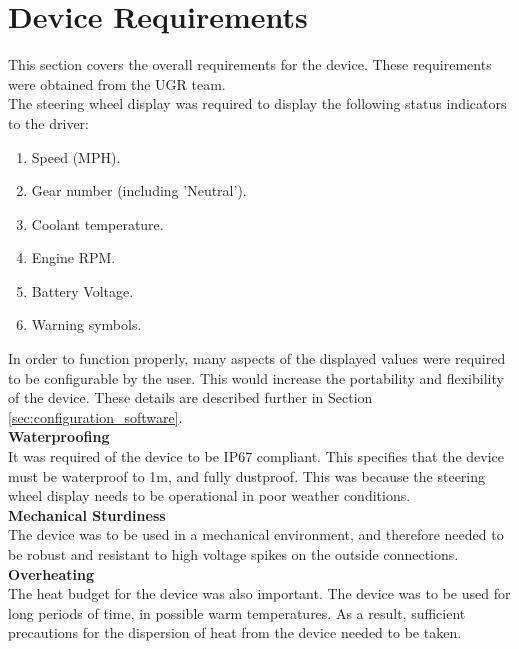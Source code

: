 \documentclass[a4paper,12pt]{article}
\begin{document}
\newpage
\section{Device Requirements}
\label{sec:device_requirements}

This section covers the overall requirements for the device. These requirements were obtained from the UGR team. \\

The steering wheel display was required to display the following status indicators to the driver:

\begin{enumerate}
  \item Speed (MPH).
  \item Gear number (including 'Neutral').
  \item Coolant temperature.
  \item Engine RPM.
  \item Battery Voltage.
  \item Warning symbols.
\end{enumerate}

In order to function properly, many aspects of the displayed values were required to be configurable by the user. This would increase the portability and flexibility of the device. These details are described further in Section \ref{sec:configuration_software}. \\

\textbf{Waterproofing} \\

It was required of the device to be IP67 compliant. This specifies that the device must be waterproof to 1m, and fully dustproof. This was because the steering wheel display needs to be operational in poor weather conditions. \\

\textbf{Mechanical Sturdiness} \\

The device was to be used in a mechanical environment, and therefore needed to be robust and resistant to high voltage spikes on the outside connections. \\

\textbf{Overheating} \\

The heat budget for the device was also important. The device was to be used for long periods of time, in possible warm temperatures. As a result, sufficient precautions for the dispersion of heat from the device needed to be taken.
\end{document}
